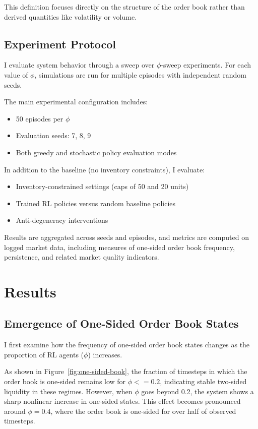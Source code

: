 \documentclass[11pt]{article}
\begin{document}
This definition focuses directly on the structure of the order book rather than derived quantities like volatility or volume.

\subsection{Experiment Protocol}

I evaluate system behavior through a sweep over $\phi$-sweep experiments. For each value of $\phi$, simulations are run for multiple episodes with independent random seeds.

The main experimental configuration includes:
\begin{itemize}[leftmargin=2em]
    \item 50 episodes per $\phi$
    \item Evaluation seeds: 7, 8, 9
    \item Both greedy and stochastic policy evaluation modes
\end{itemize}

In addition to the baseline (no inventory constraints), I evaluate:
\begin{itemize}[leftmargin=2em]
    \item Inventory-constrained settings (caps of 50 and 20 units)
    \item Trained RL policies versus random baseline policies
    \item Anti-degeneracy interventions
\end{itemize}

Results are aggregated across seeds and episodes, and metrics are computed on logged market data, including measures of one-sided order book frequency, persistence, and related market quality indicators.

\section{Results}

\subsection{Emergence of One-Sided Order Book States}

I first examine how the frequency of one-sided order book states changes as the proportion of RL agents ($\phi$) increases.

As shown in Figure~\ref{fig:one-sided-book}, the fraction of timesteps in which the order book is one-sided remains low for $\phi <= 0.2$, indicating stable two-sided liquidity in these regimes. However, when $\phi$ goes beyond 0.2, the system shows a sharp nonlinear increase in one-sided states. This effect becomes pronounced around $\phi = 0.4$, where the order book is one-sided for over half of observed timesteps.
\end{document}
